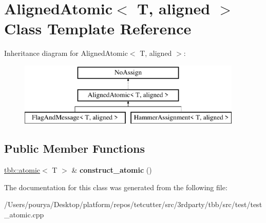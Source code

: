 \hypertarget{classAlignedAtomic}{}\section{Aligned\+Atomic$<$ T, aligned $>$ Class Template Reference}
\label{classAlignedAtomic}
Inheritance diagram for Aligned\+Atomic$<$ T, aligned $>$\+:\begin{figure}[H]
\begin{center}
\leavevmode
\includegraphics[height=3.000000cm]{classAlignedAtomic}
\end{center}
\end{figure}
\subsection*{Public Member Functions}
\begin{DoxyCompactItemize}
\item 
\hypertarget{classAlignedAtomic_a88dfb063fc1c3c6a354163b71fae7c47}{}\hyperlink{structtbb_1_1atomic}{tbb\+::atomic}$<$ T $>$ \& {\bfseries construct\+\_\+atomic} ()\label{classAlignedAtomic_a88dfb063fc1c3c6a354163b71fae7c47}

\end{DoxyCompactItemize}


The documentation for this class was generated from the following file\+:\begin{DoxyCompactItemize}
\item 
/\+Users/pourya/\+Desktop/platform/repos/tetcutter/src/3rdparty/tbb/src/test/test\+\_\+atomic.\+cpp\end{DoxyCompactItemize}
